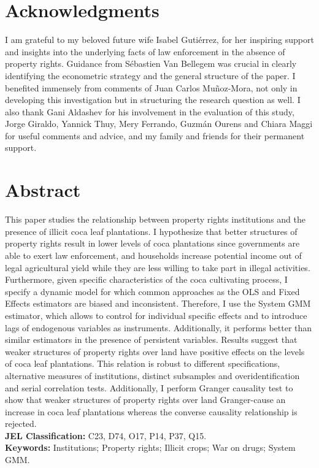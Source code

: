 \documentclass[a4paper, 12pt]{article}
\begin{document}
\pagebreak

\section*{Acknowledgments}

I am grateful to my beloved future wife Isabel Guti\'{e}rrez, for her inspiring support and insights into the underlying facts of law enforcement in the absence of property rights. Guidance from S\'{e}bastien Van Bellegem was crucial in clearly identifying the econometric strategy and the general structure of the paper. I benefited immensely from comments of Juan Carlos Mu\~{n}oz-Mora, not only in developing this investigation but in structuring the research question as well. I also thank Gani Aldashev for his involvement in the evaluation of this study, Jorge Giraldo, Yannick Thuy, Mery Ferrando, Guzm\'{a}n Ourens and Chiara Maggi for useful comments and advice, and my family and friends for their permanent support.

\pagebreak

\section*{Abstract}

This paper studies the relationship between property rights institutions and the presence of illicit coca leaf plantations. I hypothesize that better structures of property rights result in lower levels of coca plantations since governments are able to exert law enforcement, and households increase potential income out of legal agricultural yield while they are less willing to take part in illegal activities. Furthermore, given specific characteristics of the coca cultivating process, I specify a dynamic model for which common approaches as the OLS and Fixed Effects estimators are biased and inconsistent. Therefore, I use the System GMM estimator, which allows to control for individual specific effects and to introduce lags of endogenous variables as instruments. Additionally, it performs better than similar estimators in the presence of persistent variables. Results suggest that weaker structures of property rights over land have positive effects on the levels of coca leaf plantations. This relation is robust to different specifications, alternative measures of institutions, distinct subsamples and overidentification and serial correlation tests. Additionally, I perform Granger causality test to show that weaker structures of property rights over land Granger-cause an increase in coca leaf plantations whereas the converse causality relationship is rejected.
\vspace{0.5cm}
\\
\noindent \textbf{JEL Classification:} C23, D74, O17, P14, P37, Q15.
\vspace{0.5cm}
\\
\noindent \textbf{Keywords:} Institutions; Property rights; Illicit crops; War on drugs; System GMM.
\end{document}
